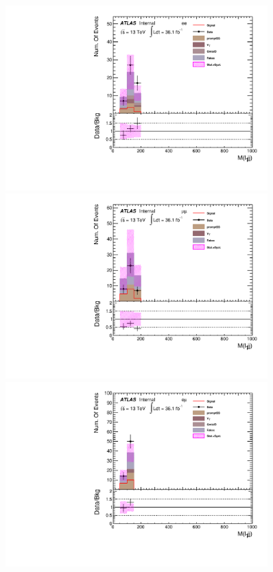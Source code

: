 \begin{figure}[h]
\begin{minipage}[t]{0.33\linewidth}
 \centering
 \includegraphics[width=0.9\textwidth,angle=-90]{fig/SigOpt/H340_S145_m_l1jj_ee.pdf}
 \end{minipage}
 \begin{minipage}[t]{0.33\linewidth}
 \centering
 \includegraphics[width=0.9\textwidth,angle=-90]{fig/SigOpt/H340_S145_m_l1jj_mumu.pdf}
 \end{minipage}
 \begin{minipage}[t]{0.33\linewidth}
 \centering
 \includegraphics[width=0.9\textwidth,angle=-90]{fig/SigOpt/H340_S145_m_l1jj_emu.pdf}

\end{minipage}
\end{figure}
